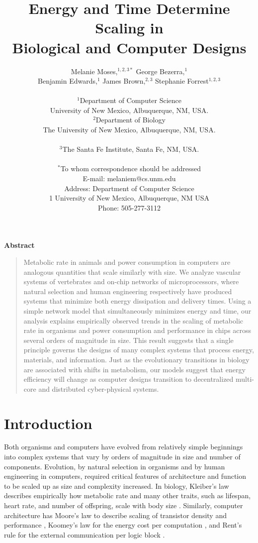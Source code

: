 \documentclass[12pt]{article}
\title{Energy and Time Determine Scaling in \\Biological and Computer Designs}
\author
{Melanie Moses,$^{1,2,3\ast}$ George Bezerra,$^{1}$ \\Benjamin Edwards,$^{1}$ James Brown,$^{2,3}$ Stephanie Forrest$^{1,2,3}$\\
\\
\normalsize{$^{1}$Department of Computer Science}\\
\normalsize{University of New Mexico, Albuquerque, NM, USA.}\\
\normalsize{$^{2}$Department of Biology}\\
\normalsize{The University of New Mexico, Albuquerque, NM, USA.}\\
\\
\normalsize{$^{3}$The Santa Fe Institute, Santa Fe, NM, USA.}\\
\\
\normalsize{$^\ast$To whom correspondence should be addressed}\\
\normalsize{E-mail: melaniem@cs.unm.edu}\\
\normalsize{Address: Department of Computer Science}\\
\normalsize{1 University of New Mexico, Albuquerque, NM USA}\\
\normalsize{Phone: 505-277-3112}\\
}
\newenvironment{sciabstract}{%
\begin{quote} \bf}
{\end{quote}}
\begin{document}
 

\newenvironment{caseof}{\setcounter{casenum}{1}}{\vskip.5\baselineskip}
\newcommand{\case}[2]{\vskip.5\baselineskip\par\noindent {\bfseries Case
\arabic{casenum}:} #1: #2\addtocounter{casenum}{1}}


\baselineskip24pt


\maketitle 


\newpage


\centerline{\Large{\bf Abstract}}

\begin{sciabstract}

  Metabolic rate in animals and power consumption in computers are analogous
  quantities that scale similarly with size.  We analyze vascular systems of
  vertebrates and on-chip networks of microprocessors, where natural selection
  and human engineering respectively have produced systems that minimize both energy dissipation
  and delivery times.   
  Using a simple network model that simultaneously minimizes energy
  and time, our analysis explains empirically observed trends in the scaling of metabolic rate in organisms  and power consumption and performance in chips across several orders of magnitude
  in size.  This result suggests that a single principle governs the designs of
  many complex systems that process energy, materials, and information. Just as
  the evolutionary transitions in biology are associated with shifts in
  metabolism, our models suggest that energy efficiency will change
  as computer designs transition to decentralized multi-core and
  distributed cyber-physical systems.

\end{sciabstract}

\newpage

\section{Introduction}
\label{sec:intro}

Both organisms and computers have evolved from relatively simple beginnings
into complex systems that vary by orders of magnitude in size and number of
components. Evolution, by natural selection in organisms and by human
engineering in computers, required critical features of architecture and
function to be scaled up as size and complexity increased. In biology,
Kleiber's law describes empirically how metabolic rate and many
other traits, such as lifespan, heart rate, and number of offspring, scale with body
size \cite{kleiber47}.  Similarly, computer architecture has Moore's law to
describe scaling of transistor density and performance \cite{moore98}, Koomey's
law for the energy cost per computation \cite{koomey11}, and Rent's rule for
the external communication per logic block \cite{christie00}.
\end{document}
